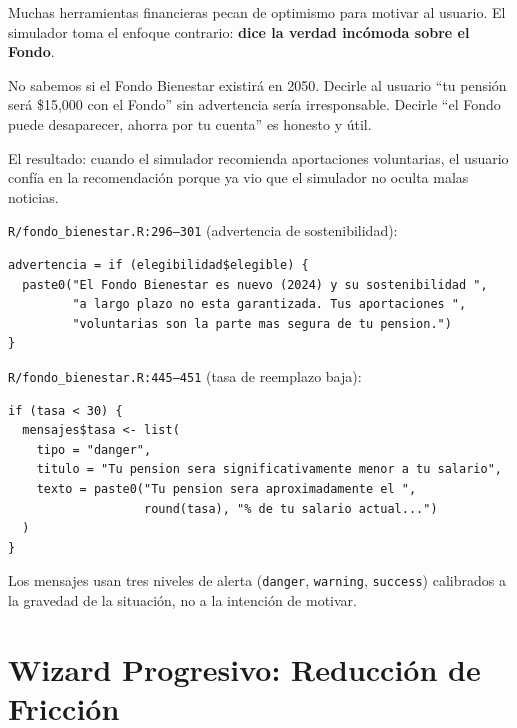 \documentclass[11pt,a4paper]{report}
\begin{document}
\begin{tcolorbox}[colback=green!5!white, colframe=green!50!black, title=\textbf{Intuici\'on: Decir la Verdad Inc\'omoda Genera Confianza}]
Muchas herramientas financieras pecan de optimismo para motivar al usuario. El simulador toma el enfoque contrario: \textbf{dice la verdad inc\'omoda sobre el Fondo}.

No sabemos si el Fondo Bienestar existir\'a en 2050. Decirle al usuario ``tu pensi\'on ser\'a \$15,000 con el Fondo'' sin advertencia ser\'ia irresponsable. Decirle ``el Fondo puede desaparecer, ahorra por tu cuenta'' es honesto y \'util.

El resultado: cuando el simulador recomienda aportaciones voluntarias, el usuario conf\'ia en la recomendaci\'on porque ya vio que el simulador no oculta malas noticias.
\end{tcolorbox}

\begin{tcolorbox}[colback=orange!5!white, colframe=orange!75!black, title=\textbf{Aplicaci\'on en C\'odigo: Mensajes Calibrados}]
\texttt{R/fondo\_bienestar.R:296--301} (advertencia de sostenibilidad):
\begin{lstlisting}
advertencia = if (elegibilidad$elegible) {
  paste0("El Fondo Bienestar es nuevo (2024) y su sostenibilidad ",
         "a largo plazo no esta garantizada. Tus aportaciones ",
         "voluntarias son la parte mas segura de tu pension.")
}
\end{lstlisting}

\texttt{R/fondo\_bienestar.R:445--451} (tasa de reemplazo baja):
\begin{lstlisting}
if (tasa < 30) {
  mensajes$tasa <- list(
    tipo = "danger",
    titulo = "Tu pension sera significativamente menor a tu salario",
    texto = paste0("Tu pension sera aproximadamente el ",
                   round(tasa), "% de tu salario actual...")
  )
}
\end{lstlisting}

Los mensajes usan tres niveles de alerta (\texttt{danger}, \texttt{warning}, \texttt{success}) calibrados a la gravedad de la situaci\'on, no a la intenci\'on de motivar.
\end{tcolorbox}


\section{Wizard Progresivo: Reducci\'on de Fricci\'on}
\end{document}
